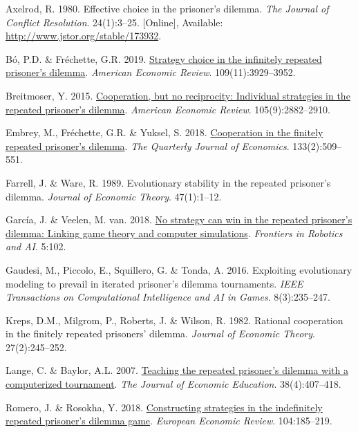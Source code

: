 \documentclass[11pt,preprint]{elsarticle}
\numberwithin{equation}{section}
\numberwithin{figure}{section}
\numberwithin{table}{section}
\newlength{\cslhangindent}
\newenvironment{CSLReferences}[2] %
{\begin{list}{}{%
	\setlength{\itemindent}{0pt}
	\setlength{\leftmargin}{0pt}
	\setlength{\parsep}{0pt}
	\ifodd #1
	\setlength{\leftmargin}{\cslhangindent}
	\setlength{\itemindent}{-1\cslhangindent}
	\fi
	\setlength{\itemsep}{#2\baselineskip}}}
{\end{list}}
\begin{document}
\label{refs}
\begin{CSLReferences}{1}{1}
Axelrod, R. 1980. Effective choice in the prisoner's dilemma. \emph{The
Journal of Conflict Resolution}. 24(1):3--25. {[}Online{]}, Available:
\url{http://www.jstor.org/stable/173932}.

Bó, P.D. \& Fréchette, G.R. 2019.
\href{https://doi.org/10.1257/aer.20181480}{Strategy choice in the
infinitely repeated prisoner's dilemma}. \emph{American Economic
Review}. 109(11):3929--3952.

Breitmoser, Y. 2015.
\href{https://doi.org/10.1257/aer.20130675}{Cooperation, but no
reciprocity: Individual strategies in the repeated prisoner's dilemma}.
\emph{American Economic Review}. 105(9):2882--2910.

Embrey, M., Fréchette, G.R. \& Yuksel, S. 2018.
\href{https://doi.org/10.1093/qje/qjx033}{Cooperation in the finitely
repeated prisoner's dilemma}. \emph{The Quarterly Journal of Economics}.
133(2):509--551.

Farrell, J. \& Ware, R. 1989. Evolutionary stability in the repeated
prisoner's dilemma. \emph{Journal of Economic Theory}. 47(1):1--12.

García, J. \& Veelen, M. van. 2018.
\href{https://doi.org/10.3389/frobt.2018.00102}{No strategy can win in
the repeated prisoner's dilemma: Linking game theory and computer
simulations}. \emph{Frontiers in Robotics and AI}. 5:102.

Gaudesi, M., Piccolo, E., Squillero, G. \& Tonda, A. 2016. Exploiting
evolutionary modeling to prevail in iterated prisoner's dilemma
tournaments. \emph{IEEE Transactions on Computational Intelligence and
AI in Games}. 8(3):235--247.

Kreps, D.M., Milgrom, P., Roberts, J. \& Wilson, R. 1982. Rational
cooperation in the finitely repeated prisoners' dilemma. \emph{Journal
of Economic Theory}. 27(2):245--252.

Lange, C. \& Baylor, A.L. 2007.
\href{https://doi.org/10.3200/JECE.38.4.407-418}{Teaching the repeated
prisoner's dilemma with a computerized tournament}. \emph{The Journal of
Economic Education}. 38(4):407--418.

Romero, J. \& Rosokha, Y. 2018.
\href{https://doi.org/10.1016/j.euroecorev.2018.02.008}{Constructing
strategies in the indefinitely repeated prisoner's dilemma game}.
\emph{European Economic Review}. 104:185--219.

\end{CSLReferences}


\end{document}
